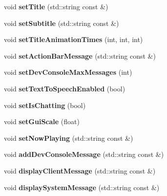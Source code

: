 \begin{DoxyCompactItemize}
void {\bfseries set\+Title} (std\+::string const \&)
\item 
\mbox{\label{struct_gui_data_acea2817f43e7534fa0e0372d5c1d2271}} 
void {\bfseries set\+Subtitle} (std\+::string const \&)
\item 
\mbox{\label{struct_gui_data_a942482beeb03b6ce08edd5b4de5c9670}} 
void {\bfseries set\+Title\+Animation\+Times} (int, int, int)
\item 
\mbox{\label{struct_gui_data_a6a0cf647fea0027da45df440d2e2bb9c}} 
void {\bfseries set\+Action\+Bar\+Message} (std\+::string const \&)
\item 
\mbox{\label{struct_gui_data_a0d29e37460af0959769548a076476d4b}} 
void {\bfseries set\+Dev\+Console\+Max\+Messages} (int)
\item 
\mbox{\label{struct_gui_data_a5ed13263390bbbb542d973b036f41af4}} 
void {\bfseries set\+Text\+To\+Speech\+Enabled} (bool)
\item 
\mbox{\label{struct_gui_data_ac9f444f1a1d9f7afb9477218c0dc97d7}} 
void {\bfseries set\+Is\+Chatting} (bool)
\item 
\mbox{\label{struct_gui_data_aafdc2807342e9184c4a5e0a7561830b4}} 
void {\bfseries set\+Gui\+Scale} (float)
\item 
\mbox{\label{struct_gui_data_a8c930c0345165679eb70a067ca30b3b1}} 
void {\bfseries set\+Now\+Playing} (std\+::string const \&)
\item 
\mbox{\label{struct_gui_data_aa89f8505fe6ffa716427ce20345d860d}} 
void {\bfseries add\+Dev\+Console\+Message} (std\+::string const \&)
\item 
\mbox{\label{struct_gui_data_ab6b105b22241289ed5f8023fe59ffac4}} 
void {\bfseries display\+Client\+Message} (std\+::string const \&)
\item 
\mbox{\label{struct_gui_data_a0dc5aa6e6b1a22c020a06ca7295f24de}} 
void {\bfseries display\+System\+Message} (std\+::string const \&)

\end{DoxyCompactItemize}
